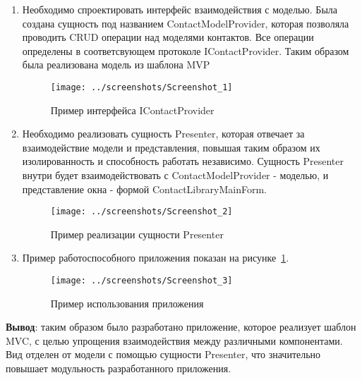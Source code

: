 \documentclass[14pt,a4paper]{extreport}
\begin{document}

\begin{enumerate}

\item Необходимо спроектировать интерфейс взаимодействия с моделью. Была создана сущность под названием ContactModelProvider, которая позволяла проводить CRUD операции над моделями контактов. Все операции определены в соответсвующем протоколе IContactProvider. Таким образом была реализована модель из шаблона MVP

\begin{figure}[ht]
\centering
\texttt{[image: ../screenshots/Screenshot\_1]}
\caption{Пример интерфейса IContactProvider}
\end{figure}

\item Необходимо реализовать сущность Presenter, которая отвечает за взаимодействие модели и представления, повышая таким образом их изолированность и способность работать независимо. Сущность Presenter внутри будет взаимодействовать с ContactModelProvider - моделью, и представление окна - формой ContactLibraryMainForm.

\begin{figure}[ht]
\centering
\texttt{[image: ../screenshots/Screenshot\_2]}
\caption{Пример реализации сущности Presenter}
\end{figure}

\item Пример работоспособного приложения показан на рисунке~\ref{working-app}.

\begin{figure}[ht]
\centering
\texttt{[image: ../screenshots/Screenshot\_3]}
\caption{Пример использования приложения}
\label{working-app}
\end{figure}

\end{enumerate}

\clearpage

\textbf{Вывод}: таким образом было разработано приложение, которое реализует шаблон MVC, с целью упрощения взаимодействия между различными компонентами. Вид отделен от модели с помощью сущности Presenter, что значительно повышает модульность разработанного приложения.
\end{document}

